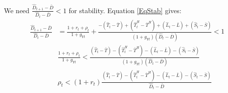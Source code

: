\documentclass[letterpaper,11pt]{article}
\theoremstyle{definition}
\begin{document}
We need $\frac{\hat D_{t+1} - \bar D}{\hat D_{t} - \bar D} < 1$ for stability.  Equation \eqref{EqStab} gives:
\begin{align} 
	\frac{\hat D_{t+1} - \bar D}{\hat D_t -\bar D} & = \frac{1+r_t+\rho_t}{1+g_{Yt}}  + \frac{-(\hat T_t - \bar T) + (\hat T^H_t -\bar T^H) + (\hat L_t -\bar L) + (\hat S_t -\bar S)}{(1+g_{Yt})(\hat D_t -\bar D)} < 1 \nonumber \\
	& \frac{1+r_t+\rho_t}{1+g_{Yt}}  < \frac{(\hat T_t - \bar T) - (\hat T^H_t -\bar T^H) - (\hat L_t -\bar L) - (\hat S_t -\bar S)}{(1+g_{Yt})(\hat D_t -\bar D)} \nonumber \\
	& \rho_t  < (1+r_t)\frac{(\hat T_t - \bar T) - (\hat T^H_t -\bar T^H) - (\hat L_t -\bar L) - (\hat S_t -\bar S)}{\hat D_t -\bar D}
\end{align} 
\end{document}
